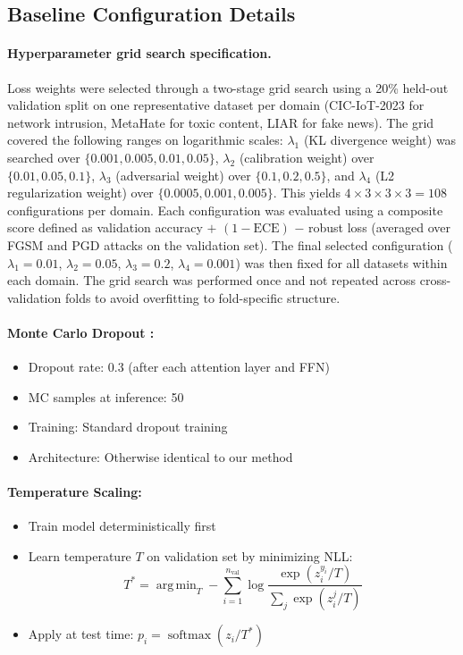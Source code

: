 \documentclass[12pt,a4paper]{article}
\theoremstyle{definition}
\DeclareMathOperator*{\argmin}{arg\,min}
\DeclareMathOperator{\softmax}{softmax}
\begin{document}
\subsection{Baseline Configuration Details}

\paragraph{Hyperparameter grid search specification.}
Loss weights were selected through a two-stage grid search using a 20\% held-out validation split on one representative dataset per domain (CIC-IoT-2023 for network intrusion, MetaHate for toxic content, LIAR for fake news). The grid covered the following ranges on logarithmic scales: $\lambda_1$ (KL divergence weight) was searched over $\{0.001, 0.005, 0.01, 0.05\}$, $\lambda_2$ (calibration weight) over $\{0.01, 0.05, 0.1\}$, $\lambda_3$ (adversarial weight) over $\{0.1, 0.2, 0.5\}$, and $\lambda_4$ (L2 regularization weight) over $\{0.0005, 0.001, 0.005\}$. This yields $4 \times 3 \times 3 \times 3 = 108$ configurations per domain. Each configuration was evaluated using a composite score defined as validation accuracy $+$ $(1 - \text{ECE})$ $-$ robust loss (averaged over FGSM and PGD attacks on the validation set). The final selected configuration ($\lambda_1 = 0.01$, $\lambda_2 = 0.05$, $\lambda_3 = 0.2$, $\lambda_4 = 0.001$) was then fixed for all datasets within each domain. The grid search was performed once and not repeated across cross-validation folds to avoid overfitting to fold-specific structure.

\paragraph{Monte Carlo Dropout \citep{gal2016dropout}:}
\begin{itemize}
\item Dropout rate: 0.3 (after each attention layer and FFN)
\item MC samples at inference: 50
\item Training: Standard dropout training
\item Architecture: Otherwise identical to our method
\end{itemize}

\paragraph{Temperature Scaling:}
\begin{itemize}
\item Train model deterministically first
\item Learn temperature $T$ on validation set by minimizing NLL:
\begin{equation}
T^* = \argmin_T -\sum_{i=1}^{n_{\text{val}}} \log \frac{\exp(z_i^{y_i}/T)}{\sum_j \exp(z_i^j/T)}
\end{equation}
\item Apply at test time: $p_i = \softmax(z_i/T^*)$
\end{itemize}
\end{document}
